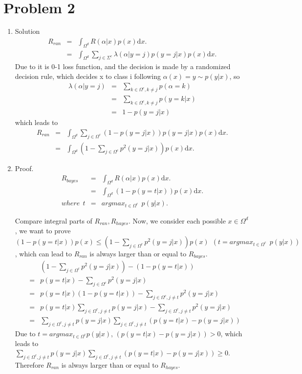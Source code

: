 \documentclass[12pt]{ctexart}
\begin{document}
\section{Problem 2}
\begin{enumerate}
\item Solution
\begin{eqnarray*}
R_{ran} &=& \int_{\Omega^d}  R(\alpha|x)p(x) \mathrm{d}x. \\
	     &=& \int_{\Omega^d} \sum_{j\in \Sigma^c} \lambda(\alpha | y=j) p(y=j|x) p(x)  \mathrm{d}x.  
\end{eqnarray*}
Due to it is 0-1 loss function, and the decision is made by a randomized decision rule, which decides x to class i following $\alpha(x) = y \sim p(y|x)$, so \\
\begin{eqnarray*}
\lambda(\alpha | y=j) &=& \sum_{k \in  \Omega^c, k \neq j} p(\alpha = k) \\
	      		        &=& \sum_{k \in  \Omega^c, k \neq j} p(y = k|x) \\
			        &=& 1 - p(y = j | x) 
\end{eqnarray*}
which leads to
\begin{eqnarray*}
R_{ran} &=& \int_{\Omega^d} \sum_{j\in \Omega^c} (1 - p(y = j | x))p(y=j|x) p(x)  \mathrm{d}x. \\
	     &=& \int_{\Omega^d} (1 - \sum_{j\in \Omega^c} p^2(y=j |x)) p(x) \mathrm{d}x.
\end{eqnarray*}

\item
Proof. 
\begin{eqnarray*}
R_{bayes} &=& \int_{\Omega^d}  R(\alpha|x)p(x) \mathrm{d}x. \\
		 &=& \int_{\Omega^d} (1 - p(y = t|x)) p(x) \mathrm{d}x.  \\
where~~t &=&argmax_{t \in \Omega^c}~~p(y|x).
\end{eqnarray*}

Compare integral parts of $R_{ran}, R_{hayes}$. Now, we consider each possible $x \in \Omega^d$, we want to prove $(1 - p(y = t|x)) p(x) \leq (1 - \sum_{j\in \Omega^c} p^2(y=j |x)) p(x)~~(t =argmax_{t \in \Omega^c}~~p(y|x))$, which can lead to $R_{ran}$ is always larger than or equal to $R_{bayes}$.  
\begin{eqnarray*}
& &(1 - \sum_{j\in \Omega^c} p^2(y=j |x)) - (1 - p(y = t|x)) \\
& = & p(y=t|x) -  \sum_{j\in \Omega^c} p^2(y=j |x) \\
& = & p(y=t|x)(1 - p(y=t|x)) - \sum_{j\in \Omega^c, j \neq t} p^2(y=j |x) \\
& = & p(y=t|x)\sum_{j\in \Omega^c, j \neq t} p(y=j|x) - \sum_{j\in \Omega^c, j \neq t} p^2(y=j |x) \\ 
& = & \sum_{j\in \Omega^c, j \neq t} p(y=j|x) \sum_{j\in \Omega^c, j \neq t} (p(y = t |x) - p(y=j|x)) 
\end{eqnarray*}
Due to $t =argmax_{t \in \Omega^c} p(y|x)$, $(p(y = t |x) - p(y=j|x)) > 0$, which leads to $\sum_{j\in \Omega^c, j \neq t} p(y=j|x) \sum_{j\in \Omega^c, j \neq t} (p(y = t |x) - p(y=j|x)) \geq 0$. Therefore $R_{ran}$ is always larger than or equal to $R_{hayes}$. 


\end{enumerate}
\end{document}
